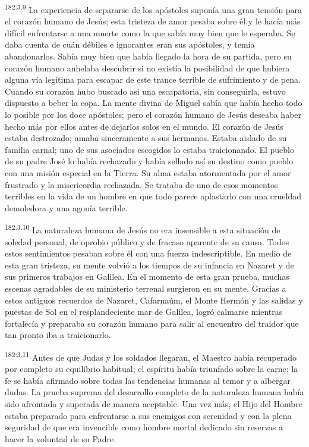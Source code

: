 \par
\textsuperscript{182:3.9} La experiencia de separarse de los apóstoles suponía una gran tensión para el corazón humano de Jesús; esta tristeza de amor pesaba sobre él y le hacía más difícil enfrentarse a una muerte como la que sabía muy bien que le esperaba. Se daba cuenta de cuán débiles e ignorantes eran sus apóstoles, y temía abandonarlos. Sabía muy bien que había llegado la hora de su partida, pero su corazón humano anhelaba descubrir si no existía la posibilidad de que hubiera alguna vía legítima para escapar de este trance terrible de sufrimiento y de pena. Cuando su corazón hubo buscado así una escapatoria, sin conseguirla, estuvo dispuesto a beber la copa. La mente divina de Miguel sabía que había hecho todo lo posible por los doce apóstoles; pero el corazón humano de Jesús deseaba haber hecho más por ellos antes de dejarlos solos en el mundo. El corazón de Jesús estaba destrozado; amaba sinceramente a sus hermanos. Estaba aislado de su familia carnal; uno de sus asociados escogidos lo estaba traicionando. El pueblo de su padre José lo había rechazado y había sellado así su destino como pueblo con una misión especial en la Tierra. Su alma estaba atormentada por el amor frustrado y la misericordia rechazada. Se trataba de uno de esos momentos terribles en la vida de un hombre en que todo parece aplastarlo con una crueldad demoledora y una agonía terrible.

\par
\textsuperscript{182:3.10} La naturaleza humana de Jesús no era insensible a esta situación de soledad personal, de oprobio público y de fracaso aparente de su causa. Todos estos sentimientos pesaban sobre él con una fuerza indescriptible. En medio de esta gran tristeza, su mente volvió a los tiempos de su infancia en Nazaret y de sus primeros trabajos en Galilea. En el momento de esta gran prueba, muchas escenas agradables de su ministerio terrenal surgieron en su mente. Gracias a estos antiguos recuerdos de Nazaret, Cafarnaúm, el Monte Hermón y las salidas y puestas de Sol en el resplandeciente mar de Galilea, logró calmarse mientras fortalecía y preparaba su corazón humano para salir al encuentro del traidor que tan pronto iba a traicionarlo.

\par
\textsuperscript{182:3.11} Antes de que Judas y los soldados llegaran, el Maestro había recuperado por completo su equilibrio habitual; el espíritu había triunfado sobre la carne; la fe se había afirmado sobre todas las tendencias humanas al temor y a albergar dudas. La prueba suprema del desarrollo completo de la naturaleza humana había sido afrontada y superada de manera aceptable. Una vez más, el Hijo del Hombre estaba preparado para enfrentarse a sus enemigos con serenidad y con la plena seguridad de que era invencible como hombre mortal dedicado sin reservas a hacer la voluntad de su Padre.